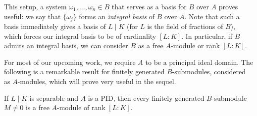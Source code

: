 This setup, a system $\omega_1,\dots,\omega_n\in B$ that serves as a basis for $B$ over $A$ proves useful: we say that $\{\omega_j\}$ forms an \emph{integral basis} of $B$ over $A$. Note that such a basis immediately gives a basis of $L\mid K$ (for $L$ is the field of fractions of $B$), which forces our integral basis to be of cardinality $[L:K]$. In particular, if $B$ admits an integral basis, we can consider $B$ as a free $A$-module or rank $[L:K]$.

For most of our upcoming work, we require $A$ to be a principal ideal domain. The following is a remarkable result for finitely generated $B$-submodules, considered as $A$-modules, which will prove very useful in the sequel.

\begin{prop}[Neukirch 2.10]
	If $L\mid K$ is separable and $A$ is a PID, then every finitely generated $B$-submodule $M\neq 0$ is a free $A$-module of rank $[L:K]$.
\end{prop}
